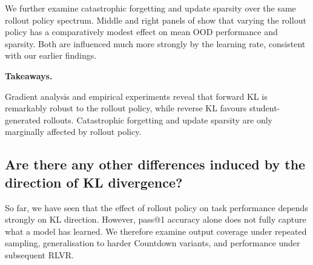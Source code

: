 \documentclass{article} %
\theoremstyle{plain}
\theoremstyle{definition}
\theoremstyle{remark}
\newenvironment{highlight}[1][Takeaways]
{%
\begin{tcolorbox}[
    enhanced,
    breakable,
    frame hidden,
    colback=takeawayblue!5,
    borderline west={2pt}{0pt}{takeawayblue},
    boxsep=0pt,
    left=2.5mm,
    right=2.5mm,
    top=2mm,
    bottom=2mm
]
\noindent
\textcolor{takeawayblue}{%
    \faLightbulb\hspace{0.4em}\textbf{#1.}\hspace{0.5em}%
}\hspace{0.35em}\ignorespaces
}
{%
\unskip
\end{tcolorbox}
}
\begin{document}
We further examine catastrophic forgetting and update sparsity over the same rollout policy spectrum. Middle and right panels of  show that varying the rollout policy has a comparatively modest effect on mean OOD performance and sparsity. Both are influenced much more strongly by the learning rate, consistent with our earlier findings.

\begin{highlight}
Gradient analysis and empirical experiments reveal that forward KL is remarkably robust to the rollout policy, while reverse KL favours student-generated rollouts. 
Catastrophic forgetting and update sparsity are only marginally affected by rollout policy.
\end{highlight}









\subsection{Are there any other differences induced by the direction of KL divergence?}
So far, we have seen that the effect of rollout policy on task performance depends strongly on KL direction. However, pass@1 accuracy alone does not fully capture what a model has learned. We therefore examine output coverage under repeated sampling, generalisation to harder Countdown variants, and performance under subsequent RLVR.

\end{document}
